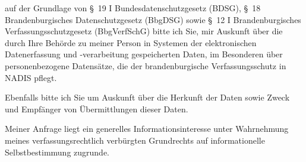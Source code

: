 auf der Grundlage von §~19 I Bundesdatenschutzgesetz (BDSG),
§~18 Brandenburgisches Datenschutzgesetz (BbgDSG) sowie §~12 I Brandenburgisches
Verfassungsschutzgesetz (BbgVerfSchG) bitte ich Sie, mir Auskunft über die durch
Ihre Behörde zu meiner Person in Systemen der elektronischen Datenerfassung und
-verarbeitung gespeicherten Daten, im Besonderen über personenbezogene Datensätze,
die der brandenburgische Verfassungsschutz in NADIS pflegt.

Ebenfalls bitte ich Sie um Auskunft über die Herkunft der Daten sowie Zweck und
Empfänger von Übermittlungen dieser Daten.

Meiner Anfrage liegt ein generelles Informationsinteresse unter Wahrnehmung
meines verfassungsrechtlich verbürgten Grundrechts auf informationelle
Selbstbestimmung zugrunde.
